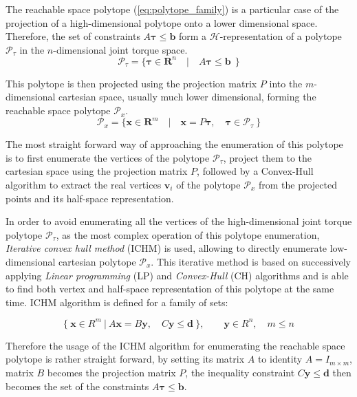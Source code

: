 The reachable space polytope (\ref{eq:polytope_family}) is a particular case of the projection of a high-dimensional polytope onto a lower dimensional space. Therefore, the set of constraints $A\bm{\tau}\leq\bm{b}$ form a $\mathcal{H}$-representation of a polytope $\mathcal{P}_\tau$ in the $n$-dimensional joint torque space.
\begin{equation}
    \mathcal{P}_\tau = \{ \bm{\tau} \in \mathbf{R}^n \quad| \quad A\bm{\tau}\leq \bm{b} ~~\}
\label{eq:polytope_torque}
\end{equation}

This polytope is then projected using the projection matrix $P$ into the $m$-dimensional cartesian space, usually much lower dimensional, forming the reachable space polytope $\mathcal{P}_x$.
\begin{equation}
    \mathcal{P}_x = \{ \bm{x} \in \mathbf{R}^m \quad| \quad \bm{x}=P\bm{\tau}, \quad \bm{\tau} \in \mathcal{P}_\tau ~\}
\label{eq:polytope_projection}
\end{equation}

The most straight forward way of approaching the enumeration of this polytope is to first enumerate the vertices of the polytope $\mathcal{P}_\tau$, project them to the cartesian space using the projection matrix $P$, followed by a Convex-Hull algorithm to extract the real vertices $\bm{v}_i$ of the polytope $\mathcal{P}_x$ from the projected points and its half-space representation.

In order to avoid enumerating all the vertices of the high-dimensional joint torque polytope $\mathcal{P}_\tau$, as the most complex operation of this polytope enumeration, \textit{Iterative convex hull method}\cite{skuric2022} (ICHM) is used, allowing to directly enumerate low-dimensional cartesian polytope $\mathcal{P}_x$. This iterative method is based on successively applying \textit{Linear programming} (LP) and \textit{Convex-Hull} (CH) algorithms and is able to find both vertex and half-space representation of this polytope at the same time. ICHM algorithm is defined for a family of sets:

\begin{equation}
\{ ~\bm{x}\in R^{m} ~|~ A\bm{x} = B\bm{y},\quad C\bm{y} \leq \bm{d}~\}, \qquad \bm{y} \in R^n,\quad m \leq n
\end{equation}

Therefore the usage of the ICHM algorithm for enumerating the reachable space polytope is rather straight forward, by setting its matrix $A$ to identity $A=I_{m \times m}$, matrix $B$ becomes the projection matrix $P$, the inequality constraint $C\bm{y} \leq \bm{d}$ then becomes the set of the constraints $A\bm{\tau}\leq\bm{b}$.


